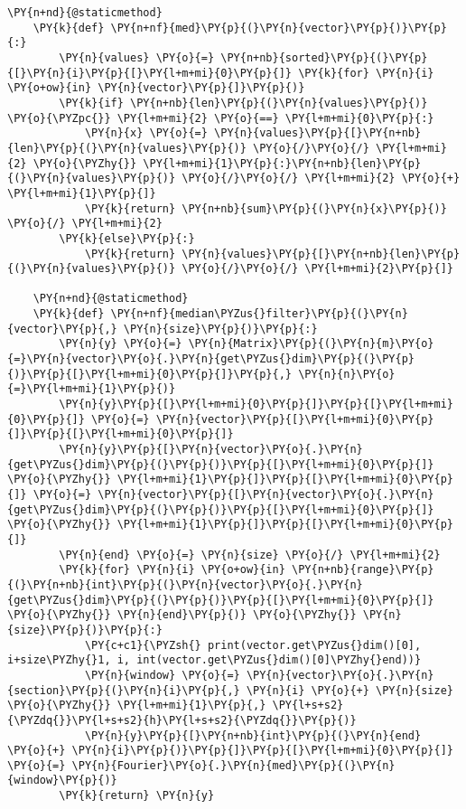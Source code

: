 \begin{Verbatim}[commandchars=\\\{\}]
    \PY{n+nd}{@staticmethod}
    \PY{k}{def} \PY{n+nf}{med}\PY{p}{(}\PY{n}{vector}\PY{p}{)}\PY{p}{:}
        \PY{n}{values} \PY{o}{=} \PY{n+nb}{sorted}\PY{p}{(}\PY{p}{[}\PY{n}{i}\PY{p}{[}\PY{l+m+mi}{0}\PY{p}{]} \PY{k}{for} \PY{n}{i} \PY{o+ow}{in} \PY{n}{vector}\PY{p}{]}\PY{p}{)}
        \PY{k}{if} \PY{n+nb}{len}\PY{p}{(}\PY{n}{values}\PY{p}{)} \PY{o}{\PYZpc{}} \PY{l+m+mi}{2} \PY{o}{==} \PY{l+m+mi}{0}\PY{p}{:}
            \PY{n}{x} \PY{o}{=} \PY{n}{values}\PY{p}{[}\PY{n+nb}{len}\PY{p}{(}\PY{n}{values}\PY{p}{)} \PY{o}{/}\PY{o}{/} \PY{l+m+mi}{2} \PY{o}{\PYZhy{}} \PY{l+m+mi}{1}\PY{p}{:}\PY{n+nb}{len}\PY{p}{(}\PY{n}{values}\PY{p}{)} \PY{o}{/}\PY{o}{/} \PY{l+m+mi}{2} \PY{o}{+} \PY{l+m+mi}{1}\PY{p}{]}
            \PY{k}{return} \PY{n+nb}{sum}\PY{p}{(}\PY{n}{x}\PY{p}{)} \PY{o}{/} \PY{l+m+mi}{2}
        \PY{k}{else}\PY{p}{:}
            \PY{k}{return} \PY{n}{values}\PY{p}{[}\PY{n+nb}{len}\PY{p}{(}\PY{n}{values}\PY{p}{)} \PY{o}{/}\PY{o}{/} \PY{l+m+mi}{2}\PY{p}{]}

    \PY{n+nd}{@staticmethod}
    \PY{k}{def} \PY{n+nf}{median\PYZus{}filter}\PY{p}{(}\PY{n}{vector}\PY{p}{,} \PY{n}{size}\PY{p}{)}\PY{p}{:}
        \PY{n}{y} \PY{o}{=} \PY{n}{Matrix}\PY{p}{(}\PY{n}{m}\PY{o}{=}\PY{n}{vector}\PY{o}{.}\PY{n}{get\PYZus{}dim}\PY{p}{(}\PY{p}{)}\PY{p}{[}\PY{l+m+mi}{0}\PY{p}{]}\PY{p}{,} \PY{n}{n}\PY{o}{=}\PY{l+m+mi}{1}\PY{p}{)}
        \PY{n}{y}\PY{p}{[}\PY{l+m+mi}{0}\PY{p}{]}\PY{p}{[}\PY{l+m+mi}{0}\PY{p}{]} \PY{o}{=} \PY{n}{vector}\PY{p}{[}\PY{l+m+mi}{0}\PY{p}{]}\PY{p}{[}\PY{l+m+mi}{0}\PY{p}{]}
        \PY{n}{y}\PY{p}{[}\PY{n}{vector}\PY{o}{.}\PY{n}{get\PYZus{}dim}\PY{p}{(}\PY{p}{)}\PY{p}{[}\PY{l+m+mi}{0}\PY{p}{]} \PY{o}{\PYZhy{}} \PY{l+m+mi}{1}\PY{p}{]}\PY{p}{[}\PY{l+m+mi}{0}\PY{p}{]} \PY{o}{=} \PY{n}{vector}\PY{p}{[}\PY{n}{vector}\PY{o}{.}\PY{n}{get\PYZus{}dim}\PY{p}{(}\PY{p}{)}\PY{p}{[}\PY{l+m+mi}{0}\PY{p}{]} \PY{o}{\PYZhy{}} \PY{l+m+mi}{1}\PY{p}{]}\PY{p}{[}\PY{l+m+mi}{0}\PY{p}{]}
        \PY{n}{end} \PY{o}{=} \PY{n}{size} \PY{o}{/} \PY{l+m+mi}{2}
        \PY{k}{for} \PY{n}{i} \PY{o+ow}{in} \PY{n+nb}{range}\PY{p}{(}\PY{n+nb}{int}\PY{p}{(}\PY{n}{vector}\PY{o}{.}\PY{n}{get\PYZus{}dim}\PY{p}{(}\PY{p}{)}\PY{p}{[}\PY{l+m+mi}{0}\PY{p}{]} \PY{o}{\PYZhy{}} \PY{n}{end}\PY{p}{)} \PY{o}{\PYZhy{}} \PY{n}{size}\PY{p}{)}\PY{p}{:}
            \PY{c+c1}{\PYZsh{} print(vector.get\PYZus{}dim()[0], i+size\PYZhy{}1, i, int(vector.get\PYZus{}dim()[0]\PYZhy{}end))}
            \PY{n}{window} \PY{o}{=} \PY{n}{vector}\PY{o}{.}\PY{n}{section}\PY{p}{(}\PY{n}{i}\PY{p}{,} \PY{n}{i} \PY{o}{+} \PY{n}{size} \PY{o}{\PYZhy{}} \PY{l+m+mi}{1}\PY{p}{,} \PY{l+s+s2}{\PYZdq{}}\PY{l+s+s2}{h}\PY{l+s+s2}{\PYZdq{}}\PY{p}{)}
            \PY{n}{y}\PY{p}{[}\PY{n+nb}{int}\PY{p}{(}\PY{n}{end} \PY{o}{+} \PY{n}{i}\PY{p}{)}\PY{p}{]}\PY{p}{[}\PY{l+m+mi}{0}\PY{p}{]} \PY{o}{=} \PY{n}{Fourier}\PY{o}{.}\PY{n}{med}\PY{p}{(}\PY{n}{window}\PY{p}{)}
        \PY{k}{return} \PY{n}{y}



\end{Verbatim}
